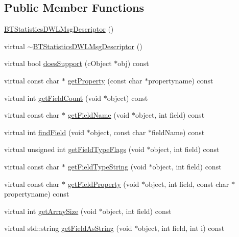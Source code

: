 \subsection*{Public Member Functions}
\begin{DoxyCompactItemize}
\item 
\hyperlink{classBTStatisticsDWLMsgDescriptor_afd2006c8f12e6834e6c8cfb671171fbb}{B\+T\+Statistics\+D\+W\+L\+Msg\+Descriptor} ()
\item 
virtual \hyperlink{classBTStatisticsDWLMsgDescriptor_a7abbf3f34f30439df097934b883f9b39}{$\sim$\+B\+T\+Statistics\+D\+W\+L\+Msg\+Descriptor} ()
\item 
virtual bool \hyperlink{classBTStatisticsDWLMsgDescriptor_acb74af73cc5d8edcb8c518e5d7ab559d}{does\+Support} (c\+Object $\ast$obj) const 
\item 
virtual const char $\ast$ \hyperlink{classBTStatisticsDWLMsgDescriptor_a72de611deef990b2e9cbdfd82cdd2db8}{get\+Property} (const char $\ast$propertyname) const 
\item 
virtual int \hyperlink{classBTStatisticsDWLMsgDescriptor_a52aea50bbf9dcec7aa47d401d2ade3bc}{get\+Field\+Count} (void $\ast$object) const 
\item 
virtual const char $\ast$ \hyperlink{classBTStatisticsDWLMsgDescriptor_accc1015d4347e58ad0e1b8634cadee5d}{get\+Field\+Name} (void $\ast$object, int field) const 
\item 
virtual int \hyperlink{classBTStatisticsDWLMsgDescriptor_afc632a1b0180b4b6f703876e8694be9f}{find\+Field} (void $\ast$object, const char $\ast$field\+Name) const 
\item 
virtual unsigned int \hyperlink{classBTStatisticsDWLMsgDescriptor_ab21541c25650b6c170be89339c3ad214}{get\+Field\+Type\+Flags} (void $\ast$object, int field) const 
\item 
virtual const char $\ast$ \hyperlink{classBTStatisticsDWLMsgDescriptor_afa150f1ad321846d46ee09190e3baba4}{get\+Field\+Type\+String} (void $\ast$object, int field) const 
\item 
virtual const char $\ast$ \hyperlink{classBTStatisticsDWLMsgDescriptor_a267a3e6b4aef2e62201a58c12d53571a}{get\+Field\+Property} (void $\ast$object, int field, const char $\ast$propertyname) const 
\item 
virtual int \hyperlink{classBTStatisticsDWLMsgDescriptor_a19efa81b95145202070413793ab53f81}{get\+Array\+Size} (void $\ast$object, int field) const 
\item 
virtual std\+::string \hyperlink{classBTStatisticsDWLMsgDescriptor_aaed50886a0630ee5626df39e794828bd}{get\+Field\+As\+String} (void $\ast$object, int field, int i) const 

\end{DoxyCompactItemize}
